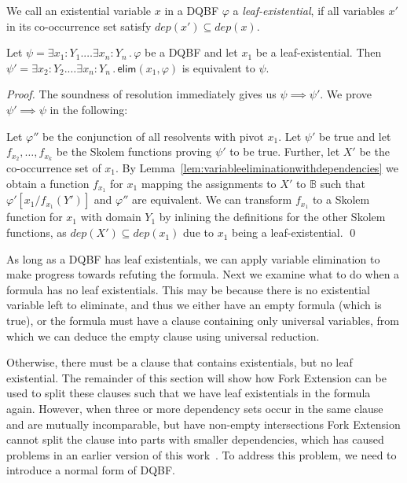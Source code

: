 \documentclass{svjour3}
\newcommand{\ldot}{\mathpunct{.}}
\newcommand{\dep}{\mathit{dep}}
\begin{document}
\begin{definition}
We call an existential variable $x$ in a DQBF $\varphi$ a \emph{leaf-existential}, if all variables $x'$ in its co-occurrence set satisfy $\dep(x')\subseteq\dep(x)$.
\end{definition}

\begin{lemma}
\label{lem:elimleafs}
	Let $\psi = \exists x_1 : Y_1. \dots \exists x_n : Y_n\ldot \varphi$ be a DQBF and let $x_1$ be a leaf-existential.
	Then  $\psi' = \exists x_2 : Y_2. \dots \exists x_{n} : Y_n\ldot \mathsf{elim}(x_1,\varphi)$ is equivalent to $\psi$. %
\end{lemma}

\begin{proof}
	The soundness of resolution immediately gives us $\psi \implies \psi'$. 
	We prove $\psi'\implies \psi$ in the following: 
	
	Let $\varphi''$ be the conjunction of all resolvents with pivot $x_1$. 
	Let $\psi'$ be true and let $f_{x_2},\dots,f_{x_k}$ be the Skolem functions proving $\psi'$ to be true.
	Further, let $X'$ be the co-occurrence set of $x_1$. 
	By Lemma~\ref{lem:variableeliminationwithdependencies} we obtain a function $f_{x_1}$ for $x_1$ mapping the assignments to $X'$ to $\mathbb{B}$ such that $\varphi'[x_1/f_{x_1}(Y')]$ and $\varphi''$ are equivalent. 
	We can transform $f_{x_1}$ to a Skolem function for $x_1$ with domain $Y_1$ by inlining the definitions for the other Skolem functions, as $\dep(X') \subseteq \dep(x_1)$ due to $x_1$ being a leaf-existential. 
	\qed
\end{proof}

As long as a DQBF has leaf existentials, we can apply variable elimination to make progress towards refuting the formula.
Next we examine what to do when a formula has no leaf existentials.
This may be because there is no existential variable left to eliminate, and thus we either have an empty formula (which is true), or the formula must have a clause containing only universal variables, from which we can deduce the empty clause using universal reduction.

Otherwise, there must be a clause that contains existentials, but no leaf existential.
The remainder of this section will show how Fork Extension can be used to split these clauses such that we have leaf existentials in the formula again.
However, when three or more dependency sets occur in the same clause and are mutually incomparable, but have non-empty intersections Fork Extension cannot split the clause into parts with smaller dependencies, which has caused problems in an earlier version of this work~\cite{Rabe/2017/ResolutionStyleProofSystemForDQBF}.
To address this problem, we need to introduce a normal form of DQBF.
\end{document}
